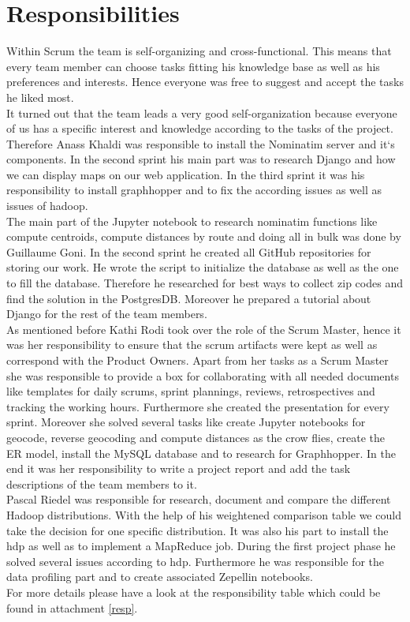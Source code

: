 
\section{Responsibilities}

Within Scrum the team is self-organizing and cross-functional. This means that every team member can choose tasks fitting his knowledge base as well as his preferences and interests. Hence everyone was free to suggest and accept the tasks he liked most.\\It turned out that the team leads a very good self-organization because everyone of us has a specific interest and knowledge according to the tasks of the project.\\Therefore Anass Khaldi was responsible to install the Nominatim server and it`s components. In the second sprint his main part was to research Django and how we can display maps on our web application. In the third sprint it was his responsibility to install graphhopper and to fix the according issues as well as issues of hadoop.\\
The main part of the Jupyter notebook to research nominatim functions like compute centroids, compute distances by route and doing all in bulk was done by Guillaume Goni. In the second sprint he created all GitHub repositories for storing our work. He wrote the script to initialize the database as well as the one to fill the database. Therefore he researched for best ways to collect zip codes and find the solution in the PostgresDB. Moreover he prepared a tutorial about Django for the rest of the team members. \\As mentioned before Kathi Rodi took over the role of the Scrum Master, hence it was her responsibility to ensure that the scrum artifacts were kept as well as correspond with the Product Owners. Apart from her tasks as a Scrum Master she was responsible to provide a box for collaborating with all needed documents like templates for daily scrums, sprint plannings, reviews, retrospectives and tracking the working hours. Furthermore she created the presentation for every sprint. Moreover she solved several tasks like create Jupyter notebooks for geocode, reverse geocoding and compute distances as the crow flies, create the ER model, install the MySQL database and to research for Graphhopper. In the end it was her responsibility to write a project report and add the task descriptions of the team members to it.\\Pascal Riedel was responsible for research, document and compare the different Hadoop distributions. With the help of his weightened comparison table we could take the decision for one specific distribution. It was also his part to install the \acs{hdp} as well as to implement a MapReduce job. During the first project phase he solved several issues according to \acs{hdp}. Furthermore he was responsible for the data profiling part and to create associated Zepellin notebooks.\\ For more details please have a look at the responsibility table which could be found in attachment \ref{resp}.
